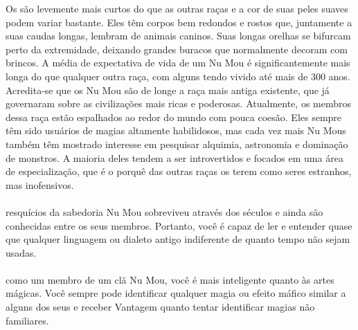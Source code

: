 %
Os  são levemente mais curtos do que as outras raças e a cor de suas peles suaves podem variar bastante.
Eles têm corpos bem redondos e rostos que, juntamente a suas caudas longas, lembram de animais caninos.
Suas longas orelhas se bifurcam perto da extremidade, deixando grandes buracos que normalmente decoram com brincos.
A média de expectativa de vida de um Nu Mou é significantemente mais longa do que qualquer outra raça, com alguns tendo vivido até mais de 300 anos.
Acredita-se que os Nu Mou são de longe a raça mais antiga existente, que já governaram sobre as civilizações mais ricas e poderosas.
Atualmente, os membros dessa raça estão espalhados ao redor do mundo com pouca coesão. 
Eles sempre têm sido usuários de magias altamente habilidosos, mas cada vez mais Nu Mous também têm mostrado interesse em pesquisar alquimia, astronomia e dominação de monstros.
A maioria deles tendem a ser introvertidos e focados em uma área de especialização, que é o porquê das outras raças os terem como seres estranhos, mas inofensivos.  
%
\\\\
%
 resquícios da sabedoria Nu Mou sobreviveu através dos séculos e ainda são conhecidas entre os seus membros.
Portanto, você é capaz de ler e entender quase que qualquer linguagem ou dialeto antigo indiferente de quanto tempo não sejam usadas.
%
\\\\
%
 como um membro de um clã Nu Mou, você é mais inteligente quanto às artes mágicas. Você sempre pode identificar qualquer magia ou efeito máfico similar a alguns dos seus e receber Vantagem quanto tentar identificar magias não familiares. 
%
\clearpage
%
%
